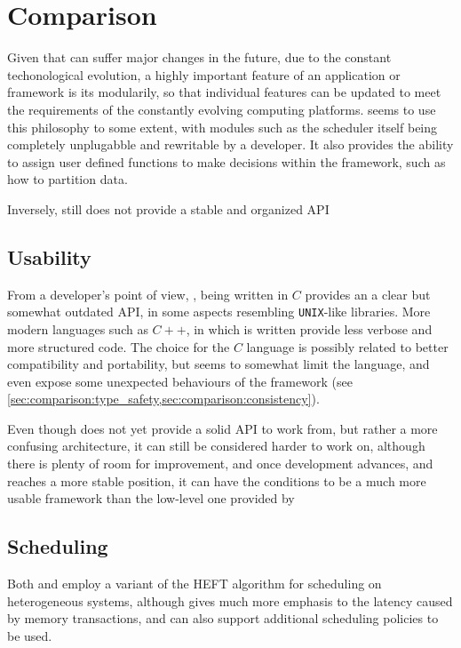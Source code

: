 \documentclass[main.tex]{subfiles}
\begin{document}
\section{Comparison} \label{cref:comparison}

Given that \hetplats can suffer major changes in the future, due to the constant techonological evolution, a highly important feature of an application or framework is its modularily, so that individual features can be updated to meet the requirements of the constantly evolving computing platforms. \starpu seems to use this philosophy to some extent, with modules such as the scheduler itself being completely unplugabble and rewritable by a developer. It also provides the ability to assign user defined functions to make decisions within the framework, such as how to partition data.

Inversely, \gama still does not provide a stable and organized API

\subsection{Usability}

From a developer's point of view, \starpu, being written in $C$ provides an a clear but somewhat outdated API, in some aspects resembling \texttt{UNIX}-like libraries. More modern languages such as $C++$, in which \gama is written provide less verbose and more structured code. The choice for the $C$ language is possibly related to better compatibility and portability, but seems to somewhat limit the language, and even expose some unexpected behaviours of the framework (see \cref{sec:comparison:type_safety,sec:comparison:consistency}).

Even though \gama does not yet provide a solid API to work from, but rather a more confusing architecture, it can still be considered harder to work on, although there is plenty of room for improvement, and once development advances, and reaches a more stable position, it can have the conditions to be a much more usable framework than the low-level one provided by \starpu

\subsection{Scheduling}

Both \starpu and \gama employ a variant of the \acs{HEFT} algorithm for scheduling on heterogeneous systems, although \starpu gives much more emphasis to the latency caused by memory transactions, and can also support additional scheduling policies to be used.
\end{document}
